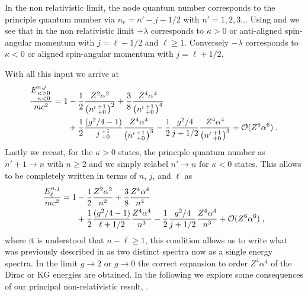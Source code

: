 In the non relativistic limit, the node quantum number corresponds to the principle quantum number via $n_{r}=n'-j-1/2$ with $n'=1,2,3\ldots$ Using  and  we see that in the non relativistic limit $+\lambda$ corresponds to $\kappa>0$ or anti-aligned spin-angular momentum with $j=\ell-1/2$ and $\ell\geq1$. Conversely $-\lambda$ corresponds to $\kappa<0$ or aligned spin-angular momentum with $j=\ell+1/2$. 

With all this input we arrive at
\begin{alignat}{1}
\label{nonrel04} \frac{E^{n,j}_{\begin{smallmatrix}
\kappa>0 \\ \kappa<0
\end{smallmatrix}}}{mc^{2}}=1&-\frac{1}{2}\frac{Z^{2}\alpha^{2}}{\left(n'\begin{smallmatrix}
+1 \\ +0
\end{smallmatrix}\right)^{2}}+\frac{3}{8}\frac{Z^{4}\alpha^{4}}{\left(n'\begin{smallmatrix}
+1 \\ +0
\end{smallmatrix}\right)^{4}}
\\ \notag &+\frac{1}{2}
\frac{(g^{2}/4-1)}{j\begin{smallmatrix}
+1 \\ +0
\end{smallmatrix}}\frac{Z^{4}\alpha^{4}}{\left(n'\begin{smallmatrix}
+1 \\ +0
\end{smallmatrix}\right)^{3}}-\frac{1}{2}\frac{g^{2}/4}{j+1/2}\frac{Z^{4}\alpha^{4}}{\left(n'\begin{smallmatrix}
+1 \\ +0
\end{smallmatrix}\right)^{3}}+\mathcal{O}(Z^{6}\alpha^{6})\;.
\end{alignat}
Lastly we recast, for the $\kappa>0$ states, the principle quantum number as $n'+1\rightarrow n$ with $n\geq2$ and we simply relabel $n'\rightarrow n$ for $\kappa<0$ states. This allows  to be completely written in terms of $n$, $j$, and $\ell$ as
\begin{alignat}{1}
\label{nonrel09} \frac{E^{n,j}_{\ell}}{mc^{2}}=1&-\frac{1}{2}\frac{Z^{2}\alpha^{2}}{n^{2}}+\frac{3}{8}\frac{Z^{4}\alpha^{4}}{n^{4}}\\
\notag &+\frac{1}{2}\frac{(g^{2}/4-1)}{\ell+1/2}\frac{Z^{4}\alpha^{4}}{n^{3}}-\frac{1}{2}\frac{g^{2}/4}{j+1/2}\frac{Z^{4}\alpha^{4}}{n^{3}}+\mathcal{O}(Z^{6}\alpha^{6})\;,\end{alignat}
where it is understood that $n-\ell\geq1$, this condition allows us to write what was previously described in  as two distinct spectra now as a single energy spectra. In the limit $g\rightarrow2$ or $g\rightarrow0$ the correct expansion to order $Z^{4}\alpha^4$ of the Dirac or KG energies are obtained. In the following we explore some consequences of our principal non-relativistic result, .

